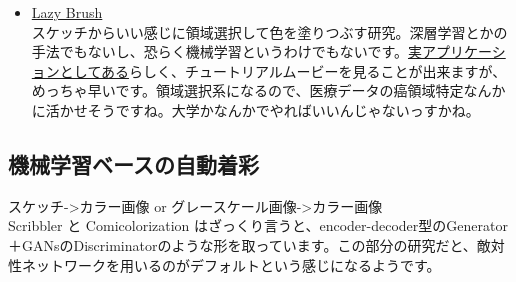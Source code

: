 \documentclass[a4paper, dvipdfmx, 10pt]{article}
\begin{document}
\begin{itemize}
\item \href{https://dcgi.fel.cvut.cz/home/sykorad/Sykora09-EG.pdf}{Lazy Brush}\\

スケッチからいい感じに領域選択して色を塗りつぶす研究。深層学習とかの手法でもないし、恐らく機械学習というわけでもないです。\href{http://animatetvp.blogspot.com/2015/01/lazybrush.html}{実アプリケーションとしてある}らしく、チュートリアルムービーを見ることが出来ますが、めっちゃ早いです。領域選択系になるので、医療データの癌領域特定なんかに活かせそうですね。大学かなんかでやればいいんじゃないっすかね。\\
\end{itemize}

\subsection{機械学習ベースの自動着彩}
\label{sec:org2be766b}
スケッチ->カラー画像 or グレースケール画像->カラー画像\\
Scribbler と Comicolorization はざっくり言うと、encoder-decoder型のGenerator＋GANsのDiscriminatorのような形を取っています。この部分の研究だと、敵対性ネットワークを用いるのがデフォルトという感じになるようです。\\
\end{document}
